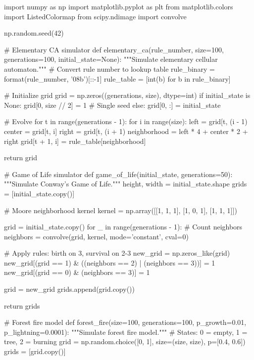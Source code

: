 \documentclass[a4paper, 11pt]{article}
\begin{document}
\begin{pycode}
import numpy as np
import matplotlib.pyplot as plt
from matplotlib.colors import ListedColormap
from scipy.ndimage import convolve

np.random.seed(42)

# Elementary CA simulator
def elementary_ca(rule_number, size=100, generations=100, initial_state=None):
    """Simulate elementary cellular automaton."""
    # Convert rule number to lookup table
    rule_binary = format(rule_number, '08b')[::-1]
    rule_table = [int(b) for b in rule_binary]

    # Initialize grid
    grid = np.zeros((generations, size), dtype=int)
    if initial_state is None:
        grid[0, size // 2] = 1  # Single seed
    else:
        grid[0, :] = initial_state

    # Evolve
    for t in range(generations - 1):
        for i in range(size):
            left = grid[t, (i - 1) %
            center = grid[t, i]
            right = grid[t, (i + 1) %
            neighborhood = left * 4 + center * 2 + right
            grid[t + 1, i] = rule_table[neighborhood]

    return grid

# Game of Life simulator
def game_of_life(initial_state, generations=50):
    """Simulate Conway's Game of Life."""
    height, width = initial_state.shape
    grids = [initial_state.copy()]

    # Moore neighborhood kernel
    kernel = np.array([[1, 1, 1],
                       [1, 0, 1],
                       [1, 1, 1]])

    grid = initial_state.copy()
    for _ in range(generations - 1):
        # Count neighbors
        neighbors = convolve(grid, kernel, mode='constant', cval=0)

        # Apply rules: birth on 3, survival on 2-3
        new_grid = np.zeros_like(grid)
        new_grid[(grid == 1) & ((neighbors == 2) | (neighbors == 3))] = 1
        new_grid[(grid == 0) & (neighbors == 3)] = 1

        grid = new_grid
        grids.append(grid.copy())

    return grids

# Forest fire model
def forest_fire(size=100, generations=100, p_growth=0.01, p_lightning=0.0001):
    """Simulate forest fire model."""
    # States: 0 = empty, 1 = tree, 2 = burning
    grid = np.random.choice([0, 1], size=(size, size), p=[0.4, 0.6])
    grids = [grid.copy()]


\end{pycode}
\end{document}

